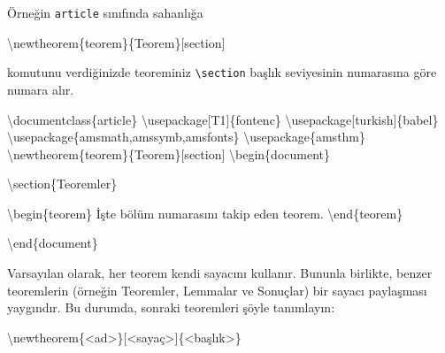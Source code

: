 \documentclass[
  letterpaper,
  DIV=11,
  numbers=noendperiod]{scrreprt}
\newenvironment{Shaded}{\begin{snugshade}}{\end{snugshade}}
\newcommand{\BuiltInTok}[1]{\textcolor[rgb]{0.00,0.23,0.31}{#1}}
\newcommand{\ExtensionTok}[1]{\textcolor[rgb]{0.00,0.23,0.31}{#1}}
\newcommand{\FunctionTok}[1]{\textcolor[rgb]{0.28,0.35,0.67}{#1}}
\newcommand{\KeywordTok}[1]{\textcolor[rgb]{0.00,0.23,0.31}{#1}}
\newcommand{\NormalTok}[1]{\textcolor[rgb]{0.00,0.23,0.31}{#1}}
\begin{document}
Örneğin \texttt{article} sınıfında sahanlığa

\begin{Shaded}
\begin{Highlighting}[]
\FunctionTok{\textbackslash{}newtheorem}\NormalTok{\{teorem\}\{Teorem\}[section]}
\end{Highlighting}
\end{Shaded}

komutunu verdiğinizde teoreminiz \texttt{\textbackslash{}section} başlık
seviyesinin numarasına göre numara alır.

\begin{Shaded}
\begin{Highlighting}[]
\BuiltInTok{\textbackslash{}documentclass}\NormalTok{\{}\ExtensionTok{article}\NormalTok{\}}
\BuiltInTok{\textbackslash{}usepackage}\NormalTok{[T1]\{}\ExtensionTok{fontenc}\NormalTok{\}}
\BuiltInTok{\textbackslash{}usepackage}\NormalTok{[turkish]\{}\ExtensionTok{babel}\NormalTok{\}}
\BuiltInTok{\textbackslash{}usepackage}\NormalTok{\{}\ExtensionTok{amsmath,amssymb,amsfonts}\NormalTok{\}}
\BuiltInTok{\textbackslash{}usepackage}\NormalTok{\{}\ExtensionTok{amsthm}\NormalTok{\}}
\FunctionTok{\textbackslash{}newtheorem}\NormalTok{\{teorem\}\{Teorem\}[section]}
\KeywordTok{\textbackslash{}begin}\NormalTok{\{}\ExtensionTok{document}\NormalTok{\}}

\KeywordTok{\textbackslash{}section}\NormalTok{\{Teoremler\}}

\KeywordTok{\textbackslash{}begin}\NormalTok{\{}\ExtensionTok{teorem}\NormalTok{\}}
\NormalTok{ İşte bölüm numarasını takip eden teorem.}
\KeywordTok{\textbackslash{}end}\NormalTok{\{}\ExtensionTok{teorem}\NormalTok{\}}



\KeywordTok{\textbackslash{}end}\NormalTok{\{}\ExtensionTok{document}\NormalTok{\}}
\end{Highlighting}
\end{Shaded}

Varsayılan olarak, her teorem kendi sayacını kullanır. Bununla birlikte,
benzer teoremlerin (örneğin Teoremler, Lemmalar ve Sonuçlar) bir sayacı
paylaşması yaygındır. Bu durumda, sonraki teoremleri şöyle tanımlayın:

\begin{Shaded}
\begin{Highlighting}[]
\FunctionTok{\textbackslash{}newtheorem}\NormalTok{\{\textless{}ad\textgreater{}\}[\textless{}sayaç\textgreater{}]\{\textless{}başlık\textgreater{}\}}
\end{Highlighting}
\end{Shaded}
\end{document}
